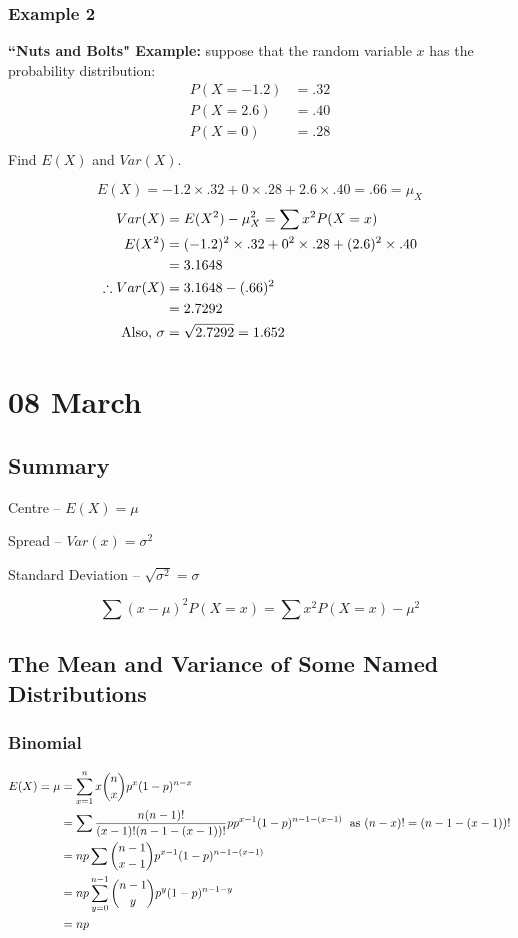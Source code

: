 \documentclass[12pt]{article}
\begin{document}
\subsubsection{Example 2}
\textbf{``Nuts and Bolts" Example:} suppose that the random variable $x$ has the probability distribution:
\begin{align*}
    P(X = -1.2) &= .32 \\
    P(X = 2.6)  &= .40 \\
    P(X = 0)    &= .28 \\
\end{align*}
Find $E(X)$ and $Var(X)$.

\[
    E(X) = -1.2 \times .32 + 0 \times .28 + 2.6 \times .40 = .66 = \mu_X
\]
\begin{align*}
    Var(X) &= E(X^2) - \mu_X^2 = \sum x^2 P(X = x) \\
    E(X^2) &= (-1.2)^2 \times .32 + 0^2 \times .28 + (2.6)^2 \times .40 \\
        &= 3.1648 \\
    \therefore Var(X) &= 3.1648 - (.66)^2 \\
        &= 2.7292 \\
    \textnormal{Also, } \sigma &= \sqrt{2.7292} = 1.652
\end{align*}

\section{08 March}
\subsection{Summary}
Centre -- $E(X) = \mu$

Spread -- $Var(x) = \sigma^2$

Standard Deviation -- $\sqrt{\sigma^2} = \sigma$

\[
    \sum (x - \mu)^2 P(X = x) = \sum x^2 P(X = x) - \mu^2
\]

\subsection{The Mean and Variance of Some Named Distributions}
\subsubsection{Binomial}
\begin{align*}
    E(X) = \mu &= \sum_{x=1}^{n} x {n \choose x} p^x (1-p)^{n-x} \\
        &= \sum \frac{n(n-1)!}{(x-1)! (n-1-(x-1))!} p p^{x-1} (1-p)^{n-1-(x-1)} \; \textnormal{ as } (n-x)! = (n-1-(x-1))! \\
        &= n p \sum {{n-1} \choose {x-1}} p^{x-1} (1-p)^{n-1-(x-1)} \\
        &= n p \sum_{y=0}^{n-1} {{n-1} \choose y} p^y (1-p)^{n-1-y} \\
        &= n p
\end{align*}
\end{document}

